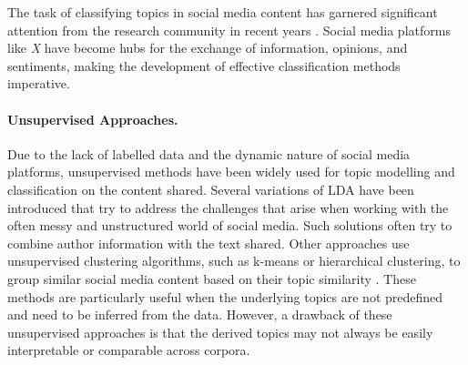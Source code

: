 The task of classifying topics in social media content has garnered significant attention from the research community in recent years \cite{schlichtkrull2023intended,10.1145/3161603,chua2016linguistic}. Social media platforms like \textit{X} have become hubs for the exchange of information, opinions, and sentiments, making the development of effective classification methods imperative. 

\paragraph{Unsupervised Approaches.}
Due to the lack of labelled data and the dynamic nature of social media platforms, unsupervised methods have been widely used for topic modelling and classification on the content shared. Several variations of \ac{LDA} have been introduced that try to address the challenges that arise when working with the often messy and unstructured world of social media. Such solutions \cite{zhao2011comparing,rosen2004author,steinskog-etal-2017-twitter} often try to  combine author information with the text shared.
Other approaches use unsupervised clustering algorithms, such as k-means or hierarchical clustering, to group similar social media content based on their topic similarity \cite{10.1007/978-3-319-67256-4_30}. These methods are particularly useful when the underlying topics are not predefined and need to be inferred from the data. However, a drawback of these unsupervised approaches is that the derived topics may not always be easily interpretable or comparable across corpora.


